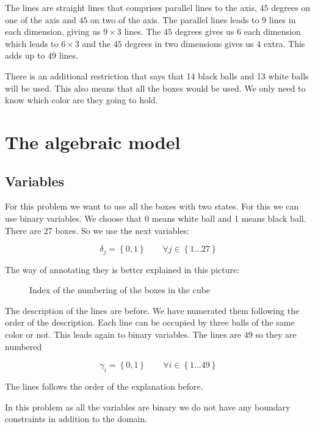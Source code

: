 \documentclass[12pt,a4paper]{report}
\begin{document}
The lines are straight lines that comprises parallel lines to the axis, $45$ degrees on one of the axis and $45$ on two of the axis. The parallel lines leads to $9$ lines in each dimension, giving us $9\times 3$ lines. The $45$ degrees gives us $6$ each dimension which leads to $6\times 3$ and the $45$ degrees in two dimensions gives us $4$ extra. This adds up to $49$ lines.

There is an additional restriction that says that 14 black balls and 13 white balls will be used. This also means that all the boxes would be used. We only need to know which color are they going to hold.
\section{The algebraic model}
\subsection{Variables}
For this problem we want to use all the boxes with two states. For this we can use binary variables. We choose that 0 means white ball and 1 means black ball. There are 27 boxes. So we use the next variables:

\begin{equation}
\delta_j = \left\lbrace 0, 1\right\rbrace\quad\quad \forall j \in \left\lbrace 1\dots 27\right\rbrace
\end{equation}

The way of annotating they is better explained in this picture:
\begin{figure}[ht]
\begin{center}
\end{center}
\caption{Index of the numbering of the boxes in the cube}
\end{figure}

The description of the lines are before. We have numerated them following the order of the description. Each line can be occupied by three balls of the same color or not. This leads again to binary variables. The lines are $49$ so they are numbered

\begin{equation}
\gamma_i = \left\lbrace 0, 1\right\rbrace\quad\quad \forall i \in \left\lbrace 1\dots 49\right\rbrace
\end{equation}

The lines follows the order of the explanation before.

In this problem as all the variables are binary we do not have any boundary constraints in addition to the domain.
\end{document}
